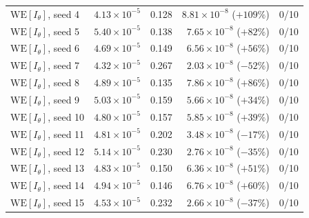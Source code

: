 \documentclass[a4paper,fleqn]{cas-sc}
\begin{document}
\begin{table}[H]
\begin{tabular}{lrrrr}
	$\mathrm{WE}[I_\theta]$, seed 4 & $4.13\times10^{-5}$ & 0.128 &
	$8.81\times10^{-8}$ ($+109\%$) & 0/10 \\
	$\mathrm{WE}[I_\theta]$, seed 5 & $5.40\times10^{-5}$ & 0.138 &
	$7.65\times10^{-8}$ ($+82\%$) & 0/10 \\
	$\mathrm{WE}[I_\theta]$, seed 6 & $4.69\times10^{-5}$ & 0.149 &
	$6.56\times10^{-8}$ ($+56\%$) & 0/10 \\
	$\mathrm{WE}[I_\theta]$, seed 7 & $4.32\times10^{-5}$ & 0.267 &
	$2.03\times10^{-8}$ ($-52\%$) & 0/10 \\
	$\mathrm{WE}[I_\theta]$, seed 8 & $4.89\times10^{-5}$ & 0.135 &
	$7.86\times10^{-8}$ ($+86\%$) & 0/10 \\
	$\mathrm{WE}[I_\theta]$, seed 9 & $5.03\times10^{-5}$ & 0.159 &
	$5.66\times10^{-8}$ ($+34\%$) & 0/10 \\
	$\mathrm{WE}[I_\theta]$, seed 10 & $4.80\times10^{-5}$ & 0.157 &
	$5.85\times10^{-8}$ ($+39\%$) & 0/10 \\
	$\mathrm{WE}[I_\theta]$, seed 11 & $4.81\times10^{-5}$ & 0.202 &
	$3.48\times10^{-8}$ ($-17\%$) & 0/10 \\
	$\mathrm{WE}[I_\theta]$, seed 12 & $5.14\times10^{-5}$ & 0.230 &
	$2.76\times10^{-8}$ ($-35\%$) & 0/10 \\
	$\mathrm{WE}[I_\theta]$, seed 13 & $4.83\times10^{-5}$ & 0.150 &
	$6.36\times10^{-8}$ ($+51\%$) & 0/10 \\
	$\mathrm{WE}[I_\theta]$, seed 14 & $4.94\times10^{-5}$ & 0.146 &
	$6.76\times10^{-8}$ ($+60\%$) & 0/10 \\
	$\mathrm{WE}[I_\theta]$, seed 15 & $4.53\times10^{-5}$ & 0.232 &
	$2.66\times10^{-8}$ ($-37\%$) & 0/10 \\
	\bottomrule
\end{tabular}
\end{table}
\end{document}
